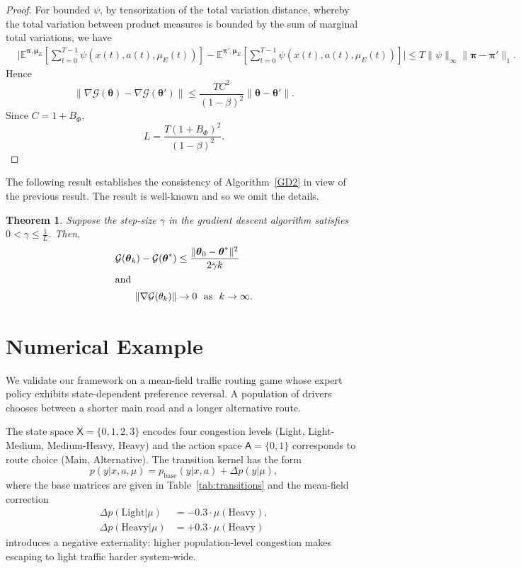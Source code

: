 \documentclass[11pt]{article}
\newcommand{\bmu}{{\boldsymbol \mu}}
\newcommand{\btheta}{{\boldsymbol \theta}}
\newcommand{\sX}{{\mathsf X}}
\newcommand{\sA}{{\mathsf A}}
\newcommand{\cG}{{\mathcal G}}
\newtheorem{theorem}{Theorem}[section]
\begin{document}
\begin{proof}
For bounded $\psi$, by tensorization of the total variation distance, whereby the total variation between product measures is bounded by the sum of marginal total variations, we have
\begin{align*}
&\bigg|\mathbb E^{\boldsymbol\pi,\bmu_E}\!\left[\sum_{t=0}^{T-1}\psi(x(t),a(t),\mu_E(t))\right]
-
\mathbb E^{\boldsymbol\pi',\bmu_E}\!\left[\sum_{t=0}^{T-1}\psi(x(t),a(t),\mu_E(t))\right]\!\bigg|
\le
T \|\psi\|_{\infty}
\|\boldsymbol\pi-\boldsymbol\pi'\|_1.
\end{align*}
Hence
\[
\|\nabla\mathcal G(\boldsymbol\theta)
-
\nabla\mathcal G(\boldsymbol\theta')\|
\le
\frac{T C^2}{(1-\beta)^2}
\|\boldsymbol\theta-\boldsymbol\theta'\|.
\]
Since $C=1+B_\Phi$,
\[
L
=
\frac{T(1+B_\Phi)^2}{(1-\beta)^2}.
\]

\end{proof}


The following result establishes the consistency of Algorithm~\ref{GD2} in view of the previous result. The result is well-known and so we omit the details.

\begin{theorem}
Suppose the step-size $\gamma$ in the gradient descent algorithm satisfies  $0<\gamma \leq \frac{1}{L}$. Then,
\begin{align*}
\cG(\btheta_k) - \cG(\btheta^*) &\leq \frac{\|\btheta_0-\btheta^*\|^2}{2\gamma k} \\   
\intertext{and}
\|\nabla \cG(\theta_k)\| &\rightarrow 0~~\text{as}~~ k \rightarrow \infty.
\end{align*}
\end{theorem}


\section{Numerical Example}

We validate our framework on a mean-field traffic routing game 
whose expert policy exhibits state-dependent preference reversal. A population of drivers chooses between a shorter main road and a longer alternative route.

The state space $\sX = \{0,1,2,3\}$ encodes four congestion levels (Light, Light-Medium, Medium-Heavy, Heavy) and the action space $\sA = \{0,1\}$ corresponds to route choice (Main, Alternative). The transition kernel has the form
\begin{equation*}
p(y|x,a,\mu) = p_{\text{base}}(y|x,a) + \Delta p(y|\mu),
\end{equation*}
where the base matrices are given in Table~\ref{tab:transitions} and the mean-field correction
\begin{align*}
\Delta p(\text{Light}|\mu) &= -0.3 \cdot \mu(\text{Heavy}), \\
\Delta p(\text{Heavy}|\mu) &= +0.3 \cdot \mu(\text{Heavy})
\end{align*}
introduces a negative externality: higher population-level congestion makes escaping to light traffic harder system-wide. 
\end{document}
